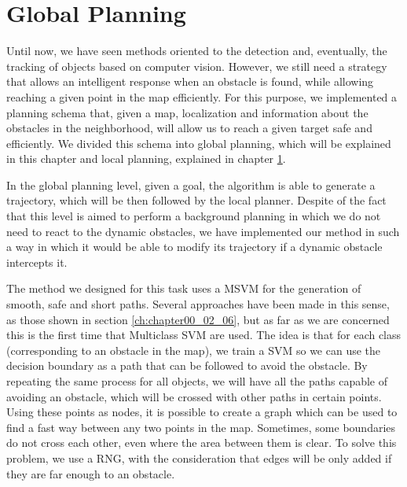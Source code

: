 
\graphicspath{{./images/chapter06/bmps/}{./images/chapter06/vects/}{./images/chapter06/}}

\chapter{Global Planning}\label{ch:chapter06}

Until now, we have seen methods oriented to the detection and, eventually, the tracking of objects based on computer vision. However, we still need a strategy that allows an intelligent response when an obstacle is found, while allowing reaching a given point in the map efficiently. For this purpose, we implemented a planning schema that, given a map, localization and information about the obstacles in the neighborhood, will allow us to reach a given target safe and efficiently. We divided this schema into global planning, which will be explained in this chapter and local planning, explained in chapter \ref{ch:chapter06}.

In the global planning level, given a goal, the algorithm is able to generate a trajectory, which will be then followed by the local planner. Despite of the fact that this level is aimed to perform a background planning in which we do not need to react to the dynamic obstacles, we have implemented our method in such a way in which it would be able to modify its trajectory if a dynamic obstacle intercepts it.

The method we designed for this task uses a \ac{MSVM} for the generation of smooth, safe and short paths. Several approaches have been made in this sense, as those shown in section \ref{ch:chapter00_02_06}, but as far as we are concerned this is the first time that Multiclass \acs{SVM} are used. The idea is that for each class (corresponding to an obstacle in the map), we train a \ac{SVM} so we can use the decision boundary as a path that can be followed to avoid the obstacle. By repeating the same process for all objects, we will have all the paths capable of avoiding an obstacle, which will be crossed with other paths in certain points. Using these points as nodes, it is possible to create a graph which can be used to find a fast way between any two points in the map. Sometimes, some boundaries do not cross each other, even where the area between them is clear. To solve this problem, we use a \ac{RNG}, with the consideration that edges will be only added if they are far enough to an obstacle.


